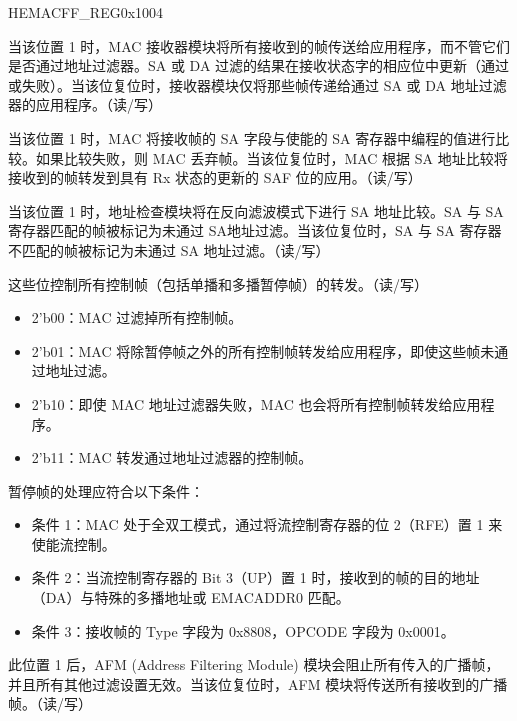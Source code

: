 \begin{register}{H}{EMACFF\_REG}{0x1004}\label{regdesc:EMACFFREG}
%
%
%
%
%
%
%
%
%
%
\regnewline%
\begin{regdesc}\begin{reglist}
\item [RECEIVE\_ALL]当该位置 1 时，MAC 接收器模块将所有接收到的帧传送给应用程序，而不管它们是否通过地址过滤器。SA 或 DA 过滤的结果在接收状态字的相应位中更新（通过或失败）。当该位复位时，接收器模块仅将那些帧传递给通过 SA 或 DA 地址过滤器的应用程序。（读/写）
\item [SAFE]当该位置 1 时，MAC 将接收帧的 SA 字段与使能的 SA 寄存器中编程的值进行比较。如果比较失败，则 MAC 丢弃帧。当该位复位时，MAC 根据 SA 地址比较将接收到的帧转发到具有 Rx 状态的更新的 SAF 位的应用。（读/写）
\item [SAIF]当该位置 1 时，地址检查模块将在反向滤波模式下进行 SA 地址比较。SA 与 SA 寄存器匹配的帧被标记为未通过 SA地址过滤。当该位复位时，SA 与 SA 寄存器不匹配的帧被标记为未通过 SA 地址过滤。（读/写）
\item [PCF]这些位控制所有控制帧（包括单播和多播暂停帧）的转发。（读/写）\begin{itemize}
\item 2'b00：MAC 过滤掉所有控制帧。\item 2'b01：MAC 将除暂停帧之外的所有控制帧转发给应用程序，即使这些帧未通过地址过滤。\item 2'b10：即使 MAC 地址过滤器失败，MAC 也会将所有控制帧转发给应用程序。\item 2'b11：MAC 转发通过地址过滤器的控制帧。\end{itemize}
暂停帧的处理应符合以下条件：
\begin{itemize}
\item 条件 1：MAC 处于全双工模式，通过将流控制寄存器的位 2（RFE）置 1 来使能流控制。\item 条件 2：当流控制寄存器的 Bit 3（UP）置 1 时，接收到的帧的目的地址（DA）与特殊的多播地址或 EMACADDR0 匹配。\item 条件 3：接收帧的 Type 字段为 0x8808，OPCODE 字段为 0x0001。\end{itemize}
\item [DBF]此位置 1 后，AFM (Address Filtering Module) 模块会阻止所有传入的广播帧，并且所有其他过滤设置无效。当该位复位时，AFM 模块将传送所有接收到的广播帧。（读/写）

\end{reglist}
\end{regdesc}
\end{register}
